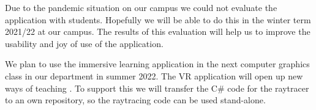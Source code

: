 \documentclass{VRARWorkshop}
\begin{document}
Due to the pandemic situation on our campus we could not evaluate the application with students.
Hopefully we will be able to do this in the winter term 2021/22 at our campus.
The results of this evaluation will help us to improve the usability and joy of use of the application.

We plan to use the immersive learning application in the next computer graphics class in our department 
in summer 2022. The VR application will open up new ways of teaching \cite{ganovelli_08, vitsas_20}.
To support this we will transfer the C\# code for the raytracer to an own repository, so the raytracing code
can be used stand-alone.

\VRARsetbibstyle

\end{document}
